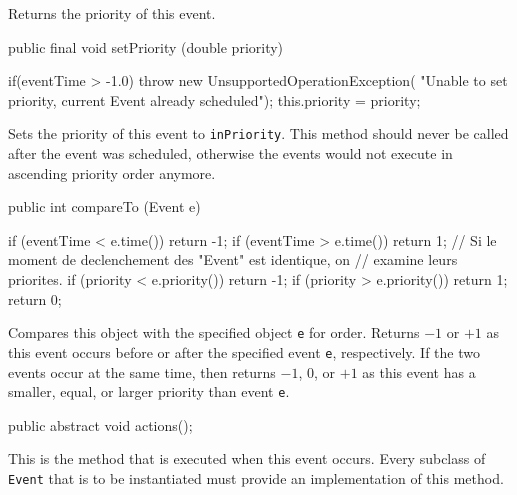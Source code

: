   \begin{tabb}  Returns the priority of this event.
  \end{tabb}
\begin{htmlonly}
\end{htmlonly}
\begin{code}

   public final void setPriority (double priority) \begin{hide} {
      if(eventTime > -1.0)
         throw new UnsupportedOperationException(
            "Unable to set priority, current Event already scheduled");
      this.priority = priority;
   } \end{hide}
\end{code}
  \begin{tabb}  Sets the priority of this event to \texttt{inPriority}.
   This method should never be called after the event was scheduled, otherwise
   the events would not execute in ascending priority order anymore.
  \end{tabb}
\begin{htmlonly}
\end{htmlonly}
\begin{code}

   public int compareTo (Event e) \begin{hide} {
      if (eventTime < e.time())
         return -1;
      if (eventTime > e.time())
         return 1;
      // Si le moment de declenchement des "Event" est identique, on
      // examine leurs priorites.
      if (priority < e.priority())
         return -1;
      if (priority > e.priority())
         return 1;
      return 0;
   } \end{hide}
\end{code}
\begin{tabb} Compares this object with the specified object \texttt{e} for
order. Returns $-1$ or $+1$ as this event occurs before or after the specified
event \texttt{e}, respectively. If the two events occur at the same time, then
returns $-1$, $0$, or $+1$ as this event has a smaller, equal, or larger
priority than event \texttt{e}.
\end{tabb}
\begin{code}

   public abstract void actions();
\end{code}
  \begin{tabb}  This is the method that is executed when this event occurs.
   Every subclass of \texttt{Event} that is to be instantiated must provide
   an implementation of this method.
  \end{tabb}
\begin{code}\begin{hide}
}
\end{hide}
\end{code}
